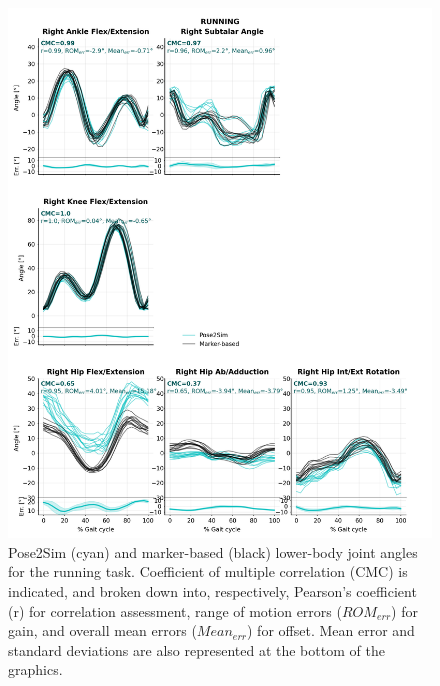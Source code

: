 \begin{figure}[!ht]
	\centering
	\def\svgwidth{1\columnwidth}
	\fontsize{10pt}{10pt}\selectfont
	\includegraphics[width=.94\linewidth]{"../Annexes/Figures/Fig_QTMRun.png"}
	\caption{Pose2Sim (cyan) and marker-based (black) lower-body joint angles for the running task. Coefficient of multiple correlation (CMC) is indicated, and broken down into, respectively, Pearson’s coefficient (r) for correlation assessment, range of motion errors (\(ROM_{err}\)) for gain, and overall mean errors (\(Mean_{err}\)) for offset. Mean error and standard deviations are also represented at the bottom of the graphics.}
	\label{fig_qtmrun}
\end{figure}

